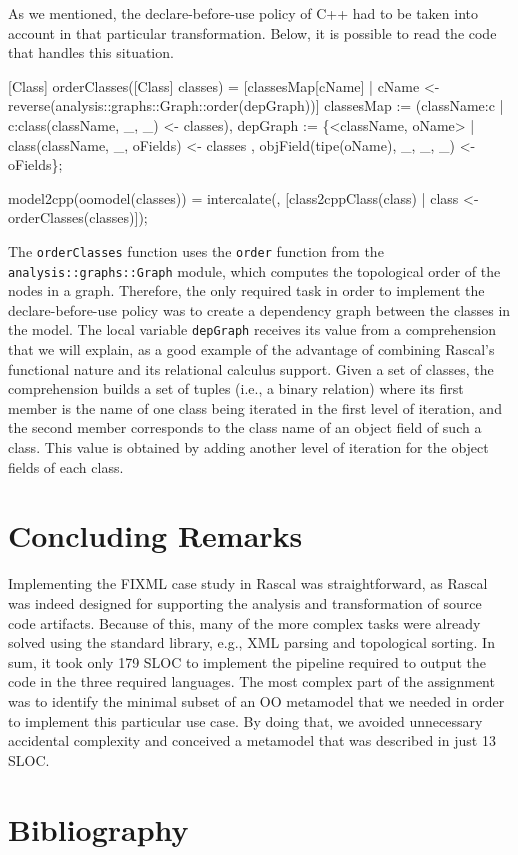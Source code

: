 \documentclass[submission,copyright,creativecommons]{eptcs}
\begin{document}
As we mentioned, the declare-before-use policy of C++ had to be taken into account in that particular transformation. Below, it is possible to read the code that handles this situation.

\begin{rascal}
[Class] orderClasses([Class] classes) =
    {}[classesMap{}[cName] | cName \textless{}- reverse(analysis::graphs::Graph::order(depGraph))]
     classesMap := (className:c | c:class(className, \_{}, \_{}) \textless{}- classes),
         depGraph := \{{}\textless{}className, oName\textgreater{} | class(className, \_{}, oFields) \textless{}- classes
                                         , objField(tipe(oName), \_{}, \_{}, \_{}) \textless{}- oFields\}{};

 model2cpp(oomodel(classes)) = 
    intercalate(, {}[class2cppClass(class) | class \textless{}- orderClasses(classes)]);
\end{rascal}

The \texttt{orderClasses} function uses the \texttt{order} function from the \texttt{analysis::graphs::Graph} module, which computes the topological order of the nodes in a graph. Therefore, the only required task in order to implement the declare-before-use policy was to create a dependency graph between the classes in the model.  The local variable \texttt{depGraph} receives its value from a comprehension that we will explain, as a good example of the advantage of combining Rascal's functional nature and its relational calculus support. Given a set of classes, the comprehension builds a set of tuples (i.e., a binary relation) where its first member is the name of one class being iterated in the first level of iteration, and the second member corresponds to the class name of an object field of such a class. This value is obtained by adding another level of iteration for the object fields of each class.

\section{Concluding Remarks}
Implementing the FIXML case study in Rascal was straightforward, as Rascal was indeed designed for supporting the analysis and transformation of source code artifacts. Because of this, many of the more complex tasks were already solved using the standard library, e.g., XML parsing and topological sorting. In sum, it took only 179 SLOC to implement the pipeline required to output the code in the three required languages. The most complex part of the assignment was to identify the minimal subset of an OO metamodel that we needed in order to implement this particular use case. By doing that, we avoided unnecessary accidental complexity and conceived a metamodel that was described in just 13 SLOC.

\section{Bibliography}

\nocite{*}


\end{document}
